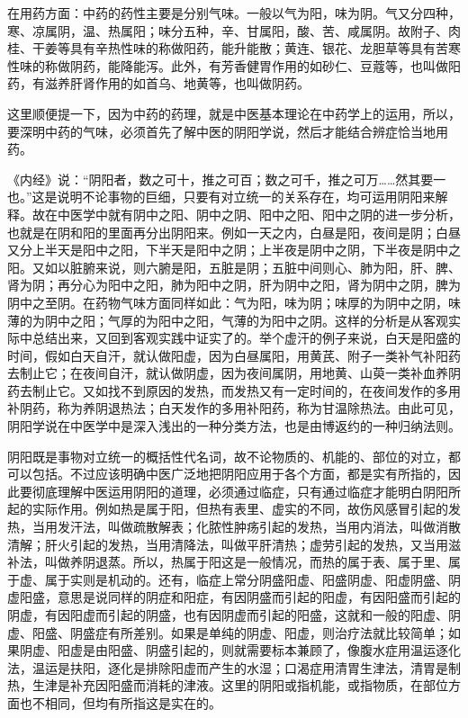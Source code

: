 \documentclass[12pt,UTF8]{ctexbook}
\begin{document}
在用药方面：中药的药性主要是分别气味。一般以气为阳，味为阴。气又分四种，寒、凉属阴，温、热属阳；味分五种，辛、甘属阳，酸、苦、咸属阴。故附子、肉桂、干姜等具有辛热性味的称做阳药，能升能散；黄连、银花、龙胆草等具有苦寒性味的称做阴药，能降能泻。此外，有芳香健胃作用的如砂仁、豆蔻等，也叫做阳药，有滋养肝肾作用的如首乌、地黄等，也叫做阴药。

这里顺便提一下，因为中药的药理，就是中医基本理论在中药学上的运用，所以，要深明中药的气味，必须首先了解中医的阴阳学说，然后才能结合辨症恰当地用药。

《内经》说：“阴阳者，数之可十，推之可百；数之可千，推之可万……然其要一也。”这是说明不论事物的巨细，只要有对立统一的关系存在，均可运用阴阳来解释。故在中医学中就有阴中之阳、阴中之阴、阳中之阳、阳中之阴的进一步分析，也就是在阴和阳的里面再分出阴阳来。例如一天之内，白昼是阳，夜间是阴；白昼又分上半天是阳中之阳，下半天是阳中之阴；上半夜是阴中之阴，下半夜是阴中之阳。又如以脏腑来说，则六腑是阳，五脏是阴；五脏中间则心、肺为阳，肝、脾、肾为阴；再分心为阳中之阳，肺为阳中之阴，肝为阴中之阳，肾为阴中之阴，脾为阴中之至阴。在药物气味方面同样如此：气为阳，味为阴；味厚的为阴中之阴，味薄的为阴中之阳；气厚的为阳中之阳，气薄的为阳中之阴。这样的分析是从客观实际中总结出来，又回到客观实践中证实了的。举个虚汗的例子来说，白天是阳盛的时间，假如白天自汗，就认做阳虚，因为白昼属阳，用黄芪、附子一类补气补阳药去制止它；在夜间自汗，就认做阴虚，因为夜间属阴，用地黄、山萸一类补血养阴药去制止它。又如找不到原因的发热，而发热又有一定时间的，在夜间发作的多用补阴药，称为养阴退热法；白天发作的多用补阳药，称为甘温除热法。由此可见，阴阳学说在中医学中是深入浅出的一种分类方法，也是由博返约的一种归纳法则。

阴阳既是事物对立统一的概括性代名词，故不论物质的、机能的、部位的对立，都可以包括。不过应该明确中医广泛地把阴阳应用于各个方面，都是实有所指的，因此要彻底理解中医运用阴阳的道理，必须通过临症，只有通过临症才能明白阴阳所起的实际作用。例如热是属于阳，但热有表里、虚实的不同，故伤风感冒引起的发热，当用发汗法，叫做疏散解表；化脓性肿疡引起的发热，当用内消法，叫做消散清解；肝火引起的发热，当用清降法，叫做平肝清热；虚劳引起的发热，又当用滋补法，叫做养阴退蒸。所以，热属于阳这是一般情况，而热的属于表、属于里、属于虚、属于实则是机动的。还有，临症上常分阴盛阳虚、阳盛阴虚、阳虚阴盛、阴虚阳盛，意思是说同样的阴症和阳症，有因阴盛而引起的阳虚，有因阳盛而引起的阴虚，有因阳虚而引起的阴盛，也有因阴虚而引起的阳盛，这就和一般的阳虚、阴虚、阳盛、阴盛症有所差别。如果是单纯的阴虚、阳虚，则治疗法就比较简单；如果阴虚、阳虚是由阳盛、阴盛引起的，则就需要标本兼顾了，像腹水症用温运逐化法，温运是扶阳，逐化是排除阳虚而产生的水湿；口渴症用清胃生津法，清胃是制热，生津是补充因阳盛而消耗的津液。这里的阴阳或指机能，或指物质，在部位方面也不相同，但均有所指这是实在的。
\end{document}
